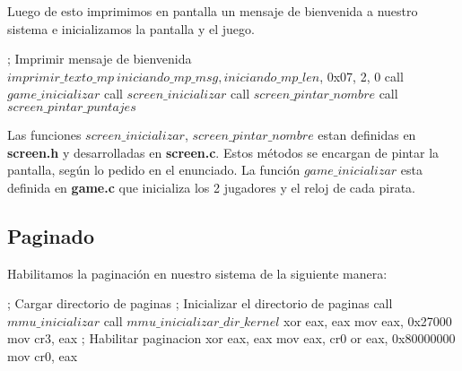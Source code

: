 Luego de esto imprimimos en pantalla un mensaje de bienvenida a nuestro sistema e inicializamos la pantalla y el juego.
\begin{algorithmic}
    \State \tab \tab ; Imprimir mensaje de bienvenida
    \State \tab \tab $imprimir\_texto\_mp \ iniciando\_mp\_msg, iniciando\_mp\_len$, 0x07, 2, 0
    \State \tab \tab call $game\_inicializar$
    \State \tab \tab call $screen\_inicializar$
    \State \tab \tab call $screen\_pintar\_nombre$
    \State \tab \tab call $screen\_pintar\_puntajes$
\end{algorithmic}

Las funciones \textit{$screen\_inicializar$}, \textit{$screen\_pintar\_nombre$} estan definidas en \textbf{screen.h} y desarrolladas en \textbf{screen.c}. Estos m\'etodos se encargan de pintar la pantalla, seg\'un lo pedido en el enunciado. La función \textit{$game\_inicializar$} esta definida en \textbf{game.c} que inicializa los 2 jugadores y el reloj de cada pirata.

\subsection{Paginado}
Habilitamos la paginaci\'on en nuestro sistema de la siguiente manera:
\begin{algorithmic}
    \State \tab ; Cargar directorio de paginas
    \State \tab ; Inicializar el directorio de paginas
    \State \tab call $mmu\_inicializar$
    \State \tab call $mmu\_inicializar\_dir\_kernel$
    \State \tab xor eax, eax
    \State \tab mov eax, 0x27000
    \State \tab mov cr3, eax
    \State \tab ; Habilitar paginacion
    \State \tab xor eax, eax
    \State \tab mov eax, cr0
    \State \tab or eax, 0x80000000
    \State \tab mov cr0, eax
\end{algorithmic}

